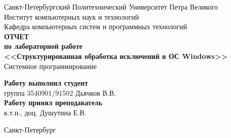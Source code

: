 \begin{titlepage}
\begin{center}
	Санкт-Петербургский Политехнический Университет Петра Великого\\[0.3cm]
	Институт компьютерных наук и технологий \\[0.3cm]
	Кафедра компьютерных систем и программных технологий\\[4cm]
	
	\textbf{ОТЧЕТ}\\ 
	\textbf{по лабораторной работе}\\[0.5cm]
	\textbf{<<Структурированная обработка исключений в ОС Windows>>}\\[0.1cm]
	Системное программирование\\[3.0cm]
\end{center}

\begin{flushright}
	\begin{minipage}{0.5\textwidth}
		\textbf{Работу выполнил студент}\\[3mm]
		группа 3540901/91502 \hfill Дьячков В.В.\\[5mm]
		\textbf{Работу принял преподаватель}\\[5mm]
		\sign[2cm] \hfill к.т.н., доц. Душутина Е.В. \\[5mm]
	\end{minipage}
\end{flushright}

\vfill

\begin{center}
	Санкт-Петербург\\[0.3cm]
	\the\year
\end{center}
\end{titlepage}

\addtocounter{page}{1}